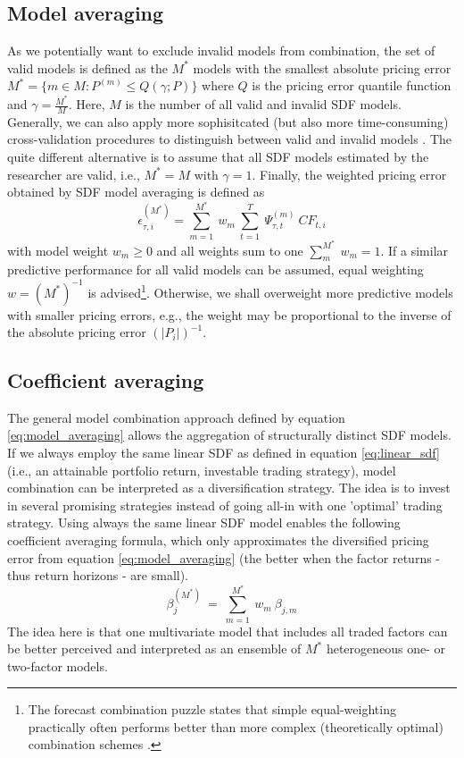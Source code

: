 \documentclass[12pt]{article}
\begin{document}
\subsection{Model averaging}
\label{sec:model_averaging}

As we potentially want to exclude invalid models from combination, the set of valid models is defined as the $M^*$ models with the smallest absolute pricing error $M^*=\{m \in M: P^{(m)} \leq Q(\gamma;P) \}$ where $Q$ is the pricing error quantile function and $\gamma = \frac{M^*}{M}$.
Here, $M$ is the number of all valid and invalid SDF models.
Generally, we can also apply more sophisitcated (but also more time-consuming) cross-validation procedures to distinguish between valid and invalid models \citep{AC10}.
The quite different alternative is to assume that all SDF models estimated by the researcher are valid, i.e., $M^*=M$ with $\gamma=1$.
Finally, the weighted pricing error obtained by SDF model averaging is defined as
\begin{equation}
\label{eq:model_averaging}
\epsilon_{\tau, i}^{(M^*)} = 
\sum_{m=1}^{M^*} \  
w_m \
\sum_{t=1}^{T} \
\Psi_{\tau,t}^{(m)}\ 
{CF}_{t, i}
\end{equation}
with model weight $w_m \geq 0$ and all weights sum to one $\sum_m^{M^*}\ w_m=1$. 
If a similar predictive performance for all valid models can be assumed, equal weighting $w=(M^*)^{-1}$ is advised\footnote{The forecast combination puzzle states that simple equal-weighting practically often performs better than more complex (theoretically optimal) combination schemes \citep{SW09,CMVW16,QRCY19}.}. 
Otherwise, we shall overweight more predictive models with smaller pricing errors, e.g., the weight may be proportional to the inverse of the absolute pricing error $\left(\left|P_i\right|\right)^{-1}$.

\subsection{Coefficient averaging}
\label{sec:coef_averaging}

The general model combination approach defined by equation \ref{eq:model_averaging} allows the aggregation of structurally distinct SDF models.
If we always employ the same linear SDF as defined in equation \ref{eq:linear_sdf} (i.e., an attainable portfolio return, investable trading strategy), model combination can be interpreted as a diversification strategy.
The idea is to invest in several promising strategies instead of going all-in with one 'optimal' trading strategy.
Using always the same linear SDF model enables the following coefficient averaging formula, which only approximates the diversified pricing error from equation \ref{eq:model_averaging} (the better when the factor returns - thus return horizons - are small).
\begin{equation}
\label{eq:coef_averaging}
\beta_j^{(M^*)}\ =\ \sum_{m=1}^{M^*}\ w_m \ \beta_{j,m}
\end{equation}
The idea here is that one multivariate model that includes all traded factors can be better perceived and interpreted as an ensemble of $M^*$ heterogeneous one- or two-factor models.
\end{document}
